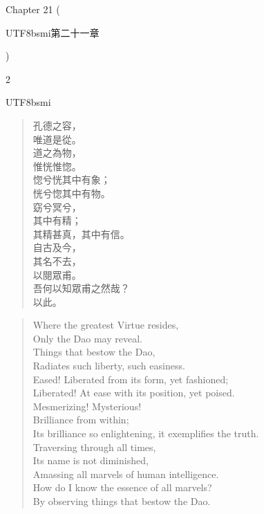 Chapter 21 (\begin{CJK*}{UTF8}{bsmi}第二十一章\end{CJK*})
\begin{paracol}{2}
\begin{CJK*}{UTF8}{bsmi}
\begin{verse}
孔德之容，\\ 唯道是從。\\ 道之為物，\\ 惟恍惟惚。\\ 惚兮恍其中有象；\\ 恍兮惚其中有物。\\ 窈兮冥兮，\\ 其中有精；\\ 其精甚真，其中有信。\\ 自古及今，\\ 其名不去，\\ 以閱眾甫。\\ 吾何以知眾甫之然哉？\\ 以此。
\end{verse}
\end{CJK*}
\switchcolumn
\vspace*{-2ex}
\begin{verse}
Where the greatest Virtue resides,\\ Only the Dao may reveal.\\ Things that bestow the Dao,\\ Radiates such liberty, such easiness.\\ Eased! Liberated from its form, yet fashioned;\\ Liberated! At ease with its position, yet poised.\\ Mesmerizing! Mysterious!\\ Brilliance from within;\\ Its brilliance so enlightening, it exemplifies the truth.\\ Traversing through all times,\\ Its name is not diminished,\\ Amassing all marvels of human intelligence.\\ How do I know the essence of all marvels?\\ By observing things that bestow the Dao.
\end{verse}
\end{paracol}



